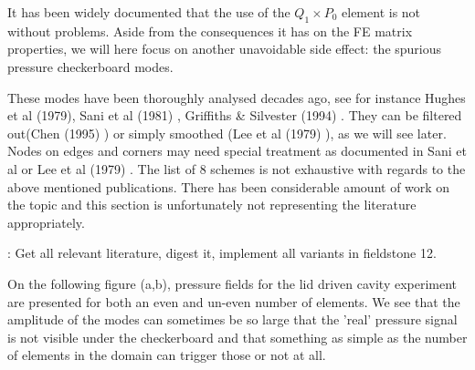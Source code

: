
It has been widely documented that the use of the $Q_1 \times P_0$ element is 
not without problems. Aside from the 
consequences it has on the FE matrix properties, we will here focus on another unavoidable side effect: 
the spurious pressure checkerboard modes. 

These modes have been thoroughly analysed decades ago, see for instance
Hughes et al (1979)\cite{hulb79}, 
Sani et al (1981) \cite{sagl81a,sagl81b},
Griffiths \& Silvester (1994) \cite{grsi94}.
They can be filtered out(Chen (1995)  \cite{chpc95}) 
or simply smoothed (Lee et al (1979) \cite{legs79}), as we will see later.
Nodes on edges and corners may need special treatment as documented in Sani et al \cite{sagl81a} or
Lee et al (1979) \cite{legs79}.
The list of 8 schemes is not exhaustive with regards to the above mentioned publications. 
There has been considerable amount of work on the topic and this section is 
unfortunately not representing the literature appropriately.

\mscthesis: Get all relevant literature, digest it, implement all variants in fieldstone 12.


On the following figure (a,b), pressure fields for the lid driven cavity experiment 
are presented for both an even and un-even number of elements. We see that 
the amplitude of the modes can sometimes be so large that the 'real' pressure signal is 
not visible under the checkerboard and that something as simple as the number of elements in the 
domain can trigger those or not at all.

